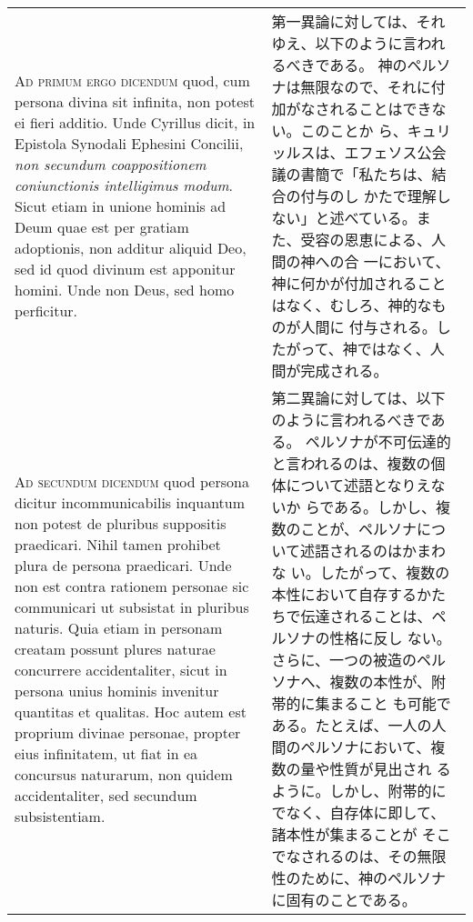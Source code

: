 \documentclass[10pt]{jsarticle} %
\begin{document}
\begin{longtable}{p{21em}p{21em}}
\\



{\scshape Ad primum ergo dicendum} quod, cum persona divina sit infinita, non
potest ei fieri additio. Unde Cyrillus dicit, in Epistola Synodali
Ephesini Concilii, {\itshape non secundum coappositionem coniunctionis
intelligimus modum}. Sicut etiam in unione hominis ad Deum quae est per
gratiam adoptionis, non additur aliquid Deo, sed id quod divinum est
apponitur homini. Unde non Deus, sed homo perficitur.


&

第一異論に対しては、それゆえ、以下のように言われるべきである。
神のペルソナは無限なので、それに付加がなされることはできない。このことか
 ら、キュリッルスは、エフェソス公会議の書簡で「私たちは、結合の付与のし
 かたで理解しない」と述べている。また、受容の恩恵による、人間の神への合
 一において、神に何かが付加されることはなく、むしろ、神的なものが人間に
 付与される。したがって、神ではなく、人間が完成される。


\\



{\scshape Ad secundum dicendum} quod persona dicitur incommunicabilis inquantum non
potest de pluribus suppositis praedicari. Nihil tamen prohibet plura de
persona praedicari. Unde non est contra rationem personae sic
communicari ut subsistat in pluribus naturis. Quia etiam in personam
creatam possunt plures naturae concurrere accidentaliter, sicut in
persona unius hominis invenitur quantitas et qualitas. Hoc autem est
proprium divinae personae, propter eius infinitatem, ut fiat in ea
concursus naturarum, non quidem accidentaliter, sed secundum
subsistentiam.


&

第二異論に対しては、以下のように言われるべきである。
ペルソナが不可伝達的と言われるのは、複数の個体について述語となりえないか
 らである。しかし、複数のことが、ペルソナについて述語されるのはかまわな
 い。したがって、複数の本性において自存するかたちで伝達されることは、ペルソナの性格に反し
 ない。さらに、一つの被造のペルソナへ、複数の本性が、附帯的に集まること
 も可能である。たとえば、一人の人間のペルソナにおいて、複数の量や性質が見出され
 るように。しかし、附帯的にでなく、自存体に即して、諸本性が集まることが
 そこでなされるのは、その無限性のために、神のペルソナに固有のことである。

\\




\end{longtable}
\end{document}
